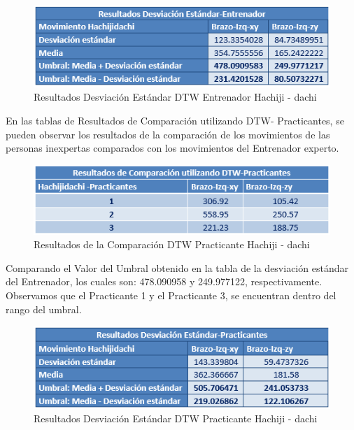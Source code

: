 \begin{figure}[H]%
	\begin{center}
		\includegraphics[scale=1]{./Figuras/Implementacion/Pruebas/Tablas/ResultadorDesvEstandar_Entrenador_Hachijidachi}
	\end{center}
	\caption{Resultados Desviación Estándar DTW Entrenador Hachiji - dachi}
	\label{fig:ResultadorDesvEstandar_Entrenador_Hachijidachi}
\end{figure}
En las tablas de Resultados de Comparación utilizando DTW- Practicantes, se pueden observar los resultados de la comparación de los movimientos de las personas inexpertas comparados con los movimientos del Entrenador experto.
\begin{figure}[H]%
	\begin{center}
		\includegraphics[scale=1]{./Figuras/Implementacion/Pruebas/Tablas/ResultadosDTW_Practicantes_Hachijidachi}
	\end{center}
	\caption{Resultados de la Comparación DTW Practicante Hachiji - dachi}
	\label{fig:ResultadosDTW_Practicantes_Hachijidachi}
\end{figure}
 Comparando el Valor del Umbral obtenido en la tabla de la desviación estándar del Entrenador, los cuales son:	478.090958 y 249.977122, respectivamente. Observamos que el Practicante 1 y el Practicante 3, se encuentran dentro del rango del umbral.
\begin{figure}[H]%
	\begin{center}
		\includegraphics[scale=1]{./Figuras/Implementacion/Pruebas/Tablas/ResultadorDesvEstandar_Practicante_Hachijidachi}
	\end{center}
	\caption{Resultados Desviación Estándar DTW Practicante Hachiji - dachi}
	\label{fig:ResultadorDesvEstandar_Practicante_Hachijidachi}
\end{figure}


